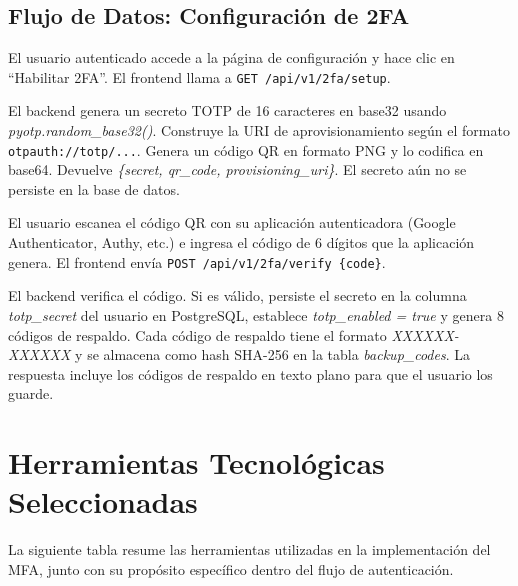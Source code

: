 \documentclass[12pt,letterpaper]{article}
\begin{document}
\subsection{Flujo de Datos: Configuraci\'on de 2FA}

\begin{description}[itemsep=4pt]
    \item[Paso 1: Solicitud de configuraci\'on.] El usuario autenticado accede a la p\'agina de configuraci\'on y hace clic en ``Habilitar 2FA''. El frontend llama a \texttt{GET /api/v1/2fa/setup}.

    \item[Paso 2: Generaci\'on de secreto.] El backend genera un secreto TOTP de 16 caracteres en base32 usando \textit{pyotp.random\_base32()}. Construye la URI de aprovisionamiento seg\'un el formato \texttt{otpauth://totp/...}. Genera un c\'odigo QR en formato PNG y lo codifica en base64. Devuelve \textit{\{secret, qr\_code, provisioning\_uri\}}. El secreto a\'un no se persiste en la base de datos.

    \item[Paso 3: Escaneo y verificaci\'on.] El usuario escanea el c\'odigo QR con su aplicaci\'on autenticadora (Google Authenticator, Authy, etc.) e ingresa el c\'odigo de 6 d\'igitos que la aplicaci\'on genera. El frontend env\'ia \texttt{POST /api/v1/2fa/verify \{code\}}.

    \item[Paso 4: Activaci\'on.] El backend verifica el c\'odigo. Si es v\'alido, persiste el secreto en la columna \textit{totp\_secret} del usuario en PostgreSQL, establece \textit{totp\_enabled = true} y genera 8 c\'odigos de respaldo. Cada c\'odigo de respaldo tiene el formato \textit{XXXXXX-XXXXXX} y se almacena como hash SHA-256 en la tabla \textit{backup\_codes}. La respuesta incluye los c\'odigos de respaldo en texto plano para que el usuario los guarde.
\end{description}

\section{Herramientas Tecnol\'ogicas Seleccionadas}

La siguiente tabla resume las herramientas utilizadas en la implementaci\'on del MFA, junto con su prop\'osito espec\'ifico dentro del flujo de autenticaci\'on.
\end{document}
